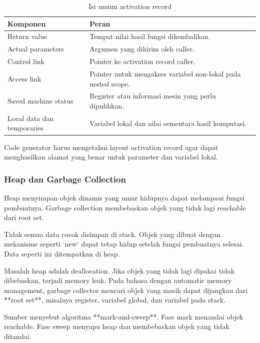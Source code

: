 \begin{table}[H]
\centering
\begin{tabularx}{\textwidth}{|L{0.26\textwidth}|X|}
\hline
\textbf{Komponen} & \textbf{Peran} \\
\hline
Return value & Tempat nilai hasil fungsi dikembalikan. \\
\hline
Actual parameters & Argumen yang dikirim oleh caller. \\
\hline
Control link & Pointer ke activation record caller. \\
\hline
Access link & Pointer untuk mengakses variabel non-lokal pada nested scope. \\
\hline
Saved machine status & Register atau informasi mesin yang perlu dipulihkan. \\
\hline
Local data dan temporaries & Variabel lokal dan nilai sementara hasil komputasi. \\
\hline
\end{tabularx}
\caption{Isi umum activation record}
\label{tab:activation-record}
\end{table}

Code generator harus mengetahui layout activation record agar dapat menghasilkan alamat yang benar untuk parameter dan variabel lokal.

\subsubsection{Heap dan Garbage Collection}

\begin{jawab}
Heap menyimpan objek dinamis yang umur hidupnya dapat melampaui fungsi pembuatnya. Garbage collection membebaskan objek yang tidak lagi reachable dari root set.
\end{jawab}

Tidak semua data cocok disimpan di stack. Objek yang dibuat dengan mekanisme seperti `new` dapat tetap hidup setelah fungsi pembuatnya selesai. Data seperti ini ditempatkan di heap.

Masalah heap adalah deallocation. Jika objek yang tidak lagi dipakai tidak dibebaskan, terjadi memory leak. Pada bahasa dengan automatic memory management, garbage collector mencari objek yang masih dapat dijangkau dari **root set**, misalnya register, variabel global, dan variabel pada stack.

Sumber menyebut algoritma **mark-and-sweep**. Fase mark menandai objek reachable. Fase sweep menyapu heap dan membebaskan objek yang tidak ditandai.

